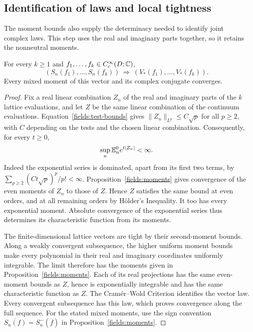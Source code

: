 \subsection{Identification of laws and local tightness}

The moment bounds also supply the determinacy needed to identify
joint complex laws.  This step uses the real and imaginary parts
together, so it retains the nonneutral moments.

\begin{proposition}
\label{fields:law}
For every $k\geq1$ and $f_1,\ldots,f_k\in C_c^\infty(D;\mathbb C)$,
\[
 (S_n(f_1),\ldots,S_n(f_k))
    \ \Longrightarrow\
 (V_*(f_1),\ldots,V_*(f_k)).
\]
Every mixed moment of this vector and its complex conjugate
converges.
\end{proposition}

\begin{proof}
Fix a real linear combination $Z_n$ of the real and imaginary
parts of the $k$ lattice evaluations, and let $Z$ be the
same linear combination of the continuum evaluations.
Equation~\eqref{fields:test-bounds} gives
$\|Z_n\|_{L^p}\leq C\sqrt p$ for all $p\geq2$, with $C$
depending on the tests and the chosen linear combination.
Consequently, for every $t\geq0$,
\begin{equation}\label{fields:exponential-moments}
 \sup_n\mathbb E_n^0 e^{t|Z_n|}<\infty.
\end{equation}
Indeed the exponential series is dominated, apart from its
first two terms, by
$\sum_{p\geq2}(Ct\sqrt p)^p/p!<\infty$.
Proposition~\ref{fields:moments} gives convergence of the even
moments of $Z_n$ to those of $Z$.  Hence $Z$ satisfies the
same bound at even orders, and at all remaining orders by
H\"older's Inequality.  It too has every exponential moment.
Absolute convergence of the exponential series thus determines
its characteristic function from its moments.

The finite-dimensional lattice vectors are tight by their
second-moment bounds.  Along a weakly convergent subsequence,
the higher uniform moment bounds make every polynomial in
their real and imaginary coordinates uniformly integrable.
The limit therefore has the moments given in
Proposition~\ref{fields:moments}.  Each of its real projections
has the same even-moment bounds as $Z$, hence is exponentially
integrable and has the same characteristic function as $Z$.
The Cram\'er--Wold Criterion identifies the vector law.
Every convergent subsequence has this law, which proves
convergence along the full sequence.  For the stated mixed
moments, use the sign convention
$\overline{S_n(f)}=S_n^-(\overline f)$ in
Proposition~\ref{fields:moments}.
\end{proof}

